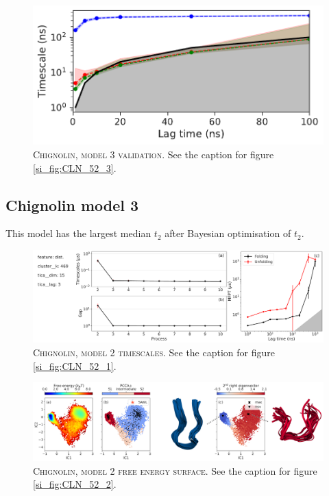 \documentclass{article}
\begin{document}
\begin{figure}[h]
    \centering
    \includegraphics[width=0.5\columnwidth]{SI_figures/CLN_23_its.pdf}
    \caption{\textsc{Chignolin, model 3 validation}. See the caption for figure \ref{si_fig:CLN_52_3}.}
    \label{si_fig:CLN_24_3}
\end{figure}

\FloatBarrier
\clearpage

\subsection{Chignolin model 3}

This model has the largest median $t_{2}$ after Bayesian optimisation of $t_{2}$.

\begin{figure}[h]
    \centering
    \includegraphics[width=\columnwidth]{SI_figures/CLN_218_SI-1.pdf}
    \caption{\textsc{Chignolin,  model 2 timescales}.  See the caption for figure \ref{si_fig:CLN_52_1}. }
    \label{si_fig:CLN_218_1}
\end{figure}

\begin{figure}[h]
    \centering
    \includegraphics[width=\columnwidth]{SI_figures/CLN_218_SI-2.png}
    \caption{\textsc{Chignolin,  model 2 free energy surface}. See the caption for figure \ref{si_fig:CLN_52_2}.}
    \label{si_fig:CLN_218_2}
\end{figure}
\end{document}
